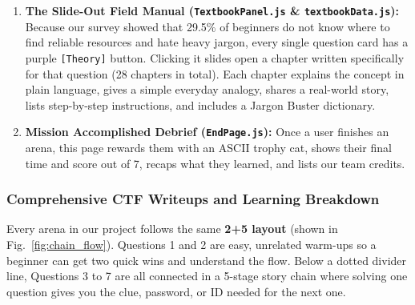 \documentclass[11pt,a4paper]{article}
\begin{document}
\begin{enumerate}
    \item \textbf{The Slide-Out Field Manual (\texttt{TextbookPanel.js} \& \texttt{textbookData.js}):} Because our survey showed that 29.5\% of beginners do not know where to find reliable resources and hate heavy jargon, every single question card has a purple \texttt{[Theory]} button. Clicking it slides open a chapter written specifically for that question (28 chapters in total). Each chapter explains the concept in plain language, gives a simple everyday analogy, shares a real-world story, lists step-by-step instructions, and includes a Jargon Buster dictionary.
    \item \textbf{Mission Accomplished Debrief (\texttt{EndPage.js}):} Once a user finishes an arena, this page rewards them with an ASCII trophy cat, shows their final time and score out of 7, recaps what they learned, and lists our team credits.
\end{enumerate}

\clearpage
\subsubsection{Comprehensive CTF Writeups and Learning Breakdown}
Every arena in our project follows the same \textbf{2+5 layout} (shown in Fig.~\ref{fig:chain_flow}). Questions 1 and 2 are easy, unrelated warm-ups so a beginner can get two quick wins and understand the flow. Below a dotted divider line, Questions 3 to 7 are all connected in a 5-stage story chain where solving one question gives you the clue, password, or ID needed for the next one.
\end{document}
